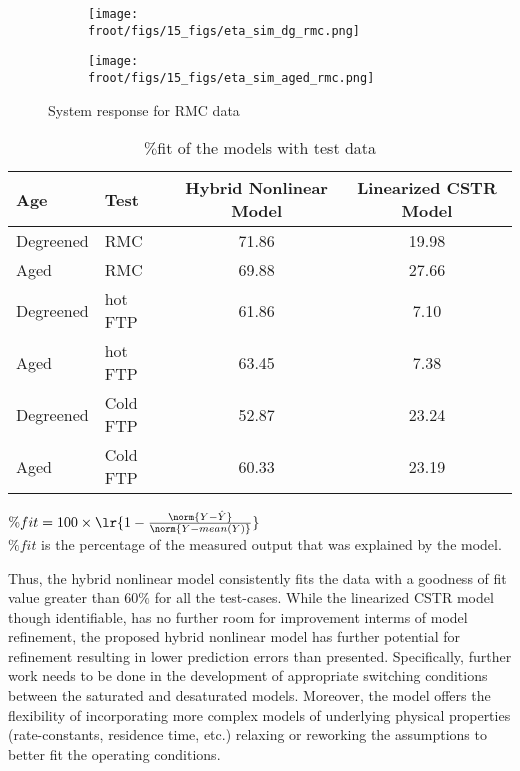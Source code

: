 \begin{figure}[H]
        \begin{minipage}{0.49\textwidth}
                \begin{figure}[H]
                        \centering
                        \texttt{[image: \\froot/figs/15\_figs/eta\_sim\_dg\_rmc.png]}
                \end{figure}
        \end{minipage}
        \begin{minipage}{0.49\textwidth}
                \begin{figure}[H]
                        \centering
                        \texttt{[image: \\froot/figs/15\_figs/eta\_sim\_aged\_rmc.png]}
                \end{figure}
        \end{minipage}
        \caption{System response for RMC data}
\end{figure}


\begin{table}[H]
        \centering
        \caption{$\%$fit of the models with test data}
        \begin{tabular}{l l c c}
                \hline \hline
                Age & Test & Hybrid Nonlinear Model & Linearized CSTR Model \\ \hline \hline
                Degreened & RMC & 71.86 & 19.98 \\
                Aged      & RMC & 69.88 & 27.66 \\ \hline
                Degreened & hot FTP & 61.86 & 7.10 \\
                Aged      & hot FTP & 63.45 & 7.38 \\ \hline
                Degreened & Cold FTP & 52.87 & 23.24 \\
                Aged      & Cold FTP & 60.33 & 23.19 \\ \hline
                \hline
        \end{tabular}

        $\%fit = 100 \times \lr{1 - \frac{\norm{Y- \hat Y}}{\norm{Y -
        mean(Y)}}}$ \\
        $\%fit$ is the percentage of the measured output that was explained by the
        model.
\end{table}

Thus, the hybrid nonlinear model consistently fits the data with a goodness of fit value greater than $60\%$ for all the
test-cases. While the linearized CSTR model though identifiable, has no further room for improvement interms of model
refinement, the proposed hybrid nonlinear model has further potential for refinement resulting in lower prediction
errors than presented. Specifically, further work needs to be done in the development of appropriate switching
conditions between the saturated and desaturated models. Moreover, the model offers the flexibility of incorporating
more complex models of underlying physical properties (rate-constants, residence time, etc.) relaxing or reworking the
assumptions to better fit the operating conditions.

